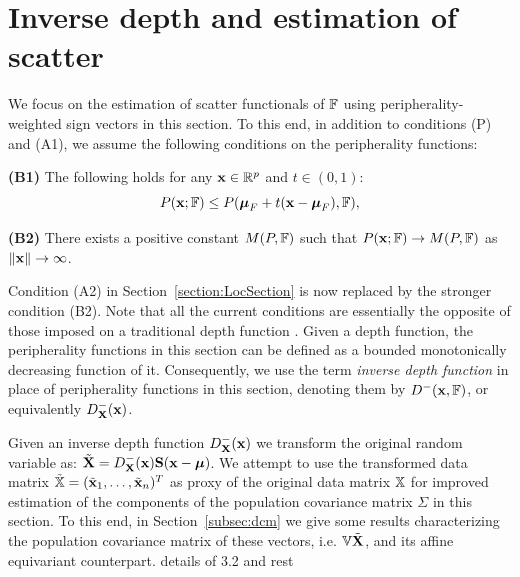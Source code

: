 \section{Inverse depth and estimation of scatter}
\label{section:dcmSection}
We focus on the estimation of scatter functionals of ${\mathbb{F}}$ using peripherality-weighted sign vectors in this section. To this end, in addition to conditions (P) and (A1), we assume the following conditions on the peripherality functions:

\vspace{1em}
\noindent\textbf{(B1)} The following holds for any ${\bf{x}} \in {\mathbb{R}}^p$ and $t \in (0,1)$:
%
$$
P({\bf{x}}; {\mathbb{F}}) \leq P({\boldsymbol{\mu}}_F + t({\bf{x}} - {\boldsymbol{\mu}}_F), {\mathbb{F}}),
$$
%

\noindent\textbf{(B2)} There exists a positive constant $M(P,{\mathbb{F}}) $ such that $P({\bf{x}}; {\mathbb{F}}) \rightarrow M(P,{\mathbb{F}})$ as $\|{\bf{x}}\| \rightarrow \infty $.
\vspace{1em}

Condition (A2) in Section~\ref{section:LocSection} is now replaced by the stronger condition (B2). Note that all the current conditions are essentially the opposite of those imposed on a traditional depth function \citep{zuo00}. Given a depth function, the peripherality functions in this section can be defined as a bounded monotonically decreasing function of it. Consequently, we use the term {\it inverse depth function} in place of peripherality functions in this section, denoting them by $D^-({\bf{x}},{\mathbb{F}})$, or equivalently $D^-_{\mathbf{X}}({\bf{x}})$.

Given an inverse depth function $D^-_{{\mathbf{X}}}({\bf{x}})$ we transform the original random variable as: $\tilde {{\mathbf{X}}} = D^-_{\mathbf{X}}({\bf{x}}) {\mathbf{S}}({\bf{x}} - {\boldsymbol{\mu}})$. We attempt to use the transformed data matrix $\tilde {{\mathbb{X}}} = (\tilde {{\bf{x}}}_1, \ldots, \tilde {{\bf{x}}}_n)^T$ as proxy of the original data matrix ${\mathbb{X}}$ for improved estimation of the components of the population covariance matrix $\Sigma$ in this section. To this end, in Section~\ref{subsec:dcm} we give some results characterizing the population covariance matrix of these vectors, i.e. ${\mathbb{V}} \tilde {{\mathbf{X}}}$, and its affine equivariant counterpart. {\colrbf details of 3.2 and rest}


